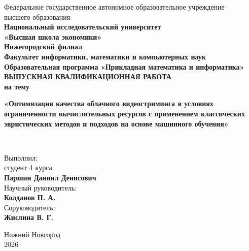 \documentclass[12pt,a4paper,oneside,openany]{report}
\begin{document}

\begin{titlepage}
\thispagestyle{empty}

\begin{center}
\small
Федеральное государственное автономное образовательное учреждение\\
высшего образования\\
\textbf{Национальный исследовательский университет\\
«Высшая школа экономики»}\\
\textbf{Нижегородский филиал}\\[0.35cm]
\textbf{Факультет информатики, математики и компьютерных наук}\\
\textbf{Образовательная программа «Прикладная математика и информатика»}\\[1.8cm]

\normalsize
\textbf{ВЫПУСКНАЯ КВАЛИФИКАЦИОННАЯ РАБОТА}\\[0.55cm]

\textbf{на тему}\\[0.35cm]
\begin{minipage}{0.86\linewidth}
\centering
\textbf{«Оптимизация качества облачного видеостриминга в условиях ограниченности вычислительных ресурсов с применением классических эвристических методов и подходов на основе машинного обучения»}
\end{minipage}\\[1.7cm]
\end{center}

\hfill
\begin{minipage}{0.48\linewidth}
\raggedright
Выполнил:\\
студент 4 курса\\
\textbf{Паршин Даниил Денисович}\\[0.65cm]

Научный руководитель:\\
\textbf{Колданов П. А.}\\[0.65cm]

Соруководитель:\\
\textbf{Жислина В. Г.}
\end{minipage}

\vfill

\begin{center}
Нижний Новгород\\
2026
\end{center}

\end{titlepage}
\end{document}
